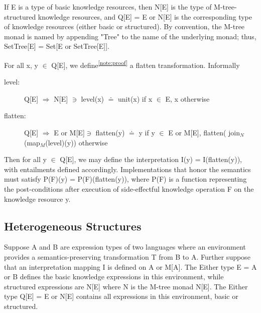 \documentclass[runningheads]{llncs}
\begin{document}
If E is a type of basic knowledge resources, then N[E] is the type of M-tree-structured knowledge resources, and
Q[E] = E or N[E] is the corresponding type of knowledge resources (either basic or structured). By convention, the M-tree monad is named by appending "Tree" to the name of the underlying monad; thus, SetTree[E] = Set[E or SetTree[E]].

For all x, y $\in$ Q[E], we define\textsuperscript{\ref{note:proof}}  a flatten transformation. Informally
\begin{description}
\item[level:] Q[E] $\Rightarrow$ N[E]
 $\ni$ level(x) $\doteq$ unit(x) if x $\in$ E,  x otherwise
\item[flatten:] Q[E] $\Rightarrow$ E or M[E]$\ni$ flatten(y)   $\doteq$ y if y $\in$  E or M[E], \newline flatten( join$_N$(map$_M$(level)(y)) otherwise
\end{description}

Then for all y $\in$ Q[E], we may define the interpretation I(y) = I(flatten(y)), with entailments defined accordingly. %
Implementations that honor the semantics must satisfy P(F)(y) = P(F)(flatten(y)), where P(F) is a function representing the post-conditions after execution of side-effectful knowledge operation F on the knowledge resource y.


\vspace{-0.3cm}
\subsection{Heterogeneous Structures}
Suppose A and B are expression types of two languages where an environment provides a semantics-preserving transformation T from B to A.
Further suppose that an interpretation mapping I is defined on A or M[A].
The Either type E = A or B defines the basic knowledge expressions in this environment, while structured expressions are N[E] where N is the M-tree monad  N[E].
The Either type Q[E] = E or N[E] contains all expressions in this environment, basic or structured. 
\end{document}
